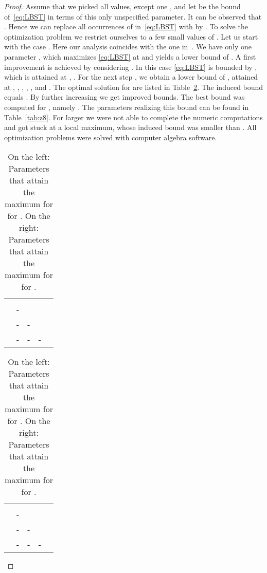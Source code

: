 \documentclass[11pt]{article}
\begin{document}
\begin{proof}
Assume that we picked all  values, except one
, and let  be the bound of~\eqref{eq:LBST}
in terms of this only unspecified parameter. It can be observed that
. Hence we can replace all occurrences of
 in~\eqref{eq:LBST} with  by .
To solve the optimization problem we restrict ourselves to a few small
values of . Let us start with the
case . Here our analysis coincides with the one in~\cite{D02}. We
have only one parameter , which maximizes \eqref{eq:LBST} at
 and yields a lower bound of . A
first improvement is achieved by considering . In this case
\eqref{eq:LBST} is bounded by
, which is attained at , . For the next
step , we obtain a lower bound of , attained at
, ,
, , , and . The optimal solution for   are listed in
Table~\ref{tab:z4}. The induced bound equals  .
By further increasing  we get improved bounds. The best bound was
computed for , namely . The parameters
realizing this bound can be found in Table~\ref{tab:z8}. For larger
 we were not able to complete the numeric computations and got
stuck at a local maximum, whose induced bound was smaller than
.
All optimization problems were solved with
computer algebra software.
\begin{table}[htdp]
\begin{minipage}[b]{0.5\linewidth}\centering
\centering
\begin{tabular}{c|| l l l l}
 & &  &  &  \\
\hline \hline
 &  &  &  &  \\
 & - &  &  &  \\
 & - & - &  &  \\
 & - & - & - & 
\end{tabular}
\end{minipage}
\begin{minipage}[b]{0.5\linewidth}
\centering
\begin{tabular}{c|| l l l l}
 & &  &  &  \\
\hline \hline
 &  &  &  &  \\
 & - &  &  &  \\
 & - & - &  &  \\
 & - & - & - & 
\end{tabular}
\end{minipage}
\caption{On the left: Parameters that attain the maximum
   for
 for . On the right: Parameters that attain the
  maximum  for
 for .}
\label{tab:z4}
\end{table}



\end{proof}
\end{document}
